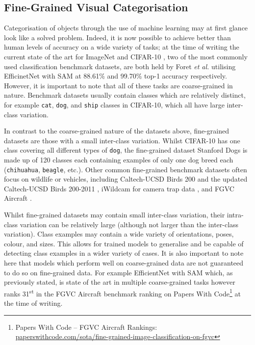 \subsection{Fine-Grained Visual Categorisation}\label{ch:Background,sec:Fine-grainedCV}

Categorisation of objects through the use of machine learning may at first glance look like a solved problem. Indeed, it is now possible to achieve better than human levels of accuracy on a wide variety of tasks; at the time of writing the current state of the art for ImageNet \cite{deng_imagenet:_2009} and CIFAR-10 \cite{krizhevsky_learning_2009}, two of the most commonly used classification benchmark datasets, are both held by Foret \textit{et al.} utilising EfficinetNet with SAM \cite{foret_sharpness-aware_2020} at 88.61\% and 99.70\% top-1 accuracy respectively. However, it is important to note that all of these tasks are coarse-grained in nature. Benchmark datasets usually contain classes which are relatively distinct, for example \texttt{cat}, \texttt{dog}, and \texttt{ship} classes in CIFAR-10, which all have large inter-class variation. 

In contrast to the coarse-grained nature of the datasets above, fine-grained datasets are those with a small inter-class variation. Whilst CIFAR-10 has one class covering all different types of \texttt{dog}, the fine-grained dataset Stanford Dogs \cite{khosla_novel_2011} is made up of 120 classes each containing examples of only one dog breed each (\texttt{chihuahua}, \texttt{beagle}, etc.). Other common fine-grained benchmark datasets often focus on wildlife or vehicles, including Caltech-UCSD Birds 200 \cite{welinder_caltech-ucsd_2010} and the updated Caltech-UCSD Birds 200-2011 \cite{wah_caltech-ucsd_2011}, iWildcam for camera trap data \cite{beery_iwildcam_2019}, and FGVC Aircraft \cite{maji_fine-grained_2013}. 

Whilst fine-grained datasets may contain small inter-class variation, their intra-class variation can be relatively large (although not larger than the inter-class variation). Class examples may contain a wide variety of orientations, poses, colour, and sizes. This allows for trained models to generalise and be capable of detecting class examples in a wider variety of cases. It is also important to note here that models which perform well on coarse-grained data are not guaranteed to do so on fine-grained data. For example EfficientNet with SAM which, as previously stated, is state of the art in multiple coarse-grained tasks however ranks 31\textsuperscript{st} in the FGVC Aircraft benchmark ranking on Papers With Code\footnote{Papers With Code -- FGVC Aircraft Rankings: \href{https://paperswithcode.com/sota/fine-grained-image-classification-on-fgvc}{paperswithcode.com/sota/fine-grained-image-classification-on-fgvc}} at the time of writing.

